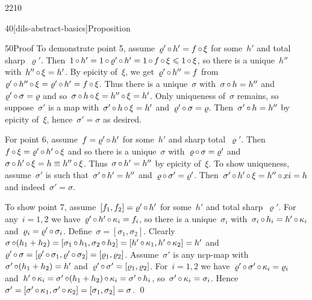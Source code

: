 \begin{parsec}{2210}
\begin{point}{40}[dils-abstract-basics]{Proposition}
\begin{point}{50}{Proof}
To demonstrate point 5, assume~$\varrho' \mathop{\circ} h' = f \mathop{\circ} \xi$
    for some~$h'$ and total sharp~$\varrho'$.
    Then~$1 \mathop{\circ} h' = 1 \mathop{\circ} \varrho' \mathop{\circ} h'
                    = 1 \mathop{\circ} f \mathop{\circ} \xi \leqslant 1 \mathop{\circ} \xi$,
                    so there is a unique~$h''$
                    with~$h'' \mathop{\circ} \xi = h'$.
By epicity of~$\xi$,
    we get~$\varrho'\mathop{\circ} h'' = f$
    from~$\varrho' \mathop{\circ} h'' \mathop{\circ} \xi = \varrho' \mathop{\circ} h' = f \mathop{\circ} \xi$.
Thus there is a unique~$\sigma$
    with~$\sigma \mathop{\circ} h = h''$ and~$\varrho' \mathop{\circ} \sigma = \varrho$
    and so~$\sigma \mathop{\circ} h \mathop{\circ} \xi = h'' \mathop{\circ} \xi = h'$.
Only uniqueness of~$\sigma$ remains,
    so suppose~$\sigma'$ is a map with~$\sigma'\mathop{\circ} h \mathop{\circ} \xi = h'$
            and~$\varrho' \mathop{\circ} \sigma = \varrho$.
    Then~$\sigma' \mathop{\circ} h = h''$ by epicity of~$\xi$,
    hence~$\sigma'=\sigma$ as desired.

For point 6, assume~$f  = \varrho' \mathop{\circ} h'$
    for some~$h'$ and sharp total~$\varrho'$.
    Then~$f \mathop{\circ} \xi = \varrho' \mathop{\circ} h' \mathop{\circ} \xi $
    and so there is a unique~$\sigma$
    with~$\varrho \mathop{\circ} \sigma = \varrho'$
    and~$\sigma \mathop{\circ} h' \mathop{\circ} \xi = h \equiv h'' \mathop{\circ} \xi$.
    Thus~$\sigma \mathop{\circ} h' = h''$ by epicity of~$\xi$.
To show uniqueness,
    assume~$\sigma'$ is such that~$\sigma' \mathop{\circ} h' = h''$
    and~$\varrho \mathop{\circ} \sigma' = \varrho'$.
    Then~$\sigma' \mathop{\circ} h' \mathop{\circ} \xi = h'' \mathop{\circ} xi = h$
    and indeed~$\sigma' = \sigma$.

To show point 7, assume~$[f_1,f_2] = \varrho'\mathop{\circ} h'$
    for some~$h'$ and total sharp~$\varrho'$.
For any~$i=1,2$
    we have~$\varrho' \mathop{\circ} h' \mathop{\circ} \kappa_i = f_i$,
    so there is a unique~$\sigma_i$
    with~$\sigma_i \mathop{\circ} h_i = h' \mathop{\circ} \kappa_i$
    and~$\varrho_i = \varrho' \mathop{\circ} \sigma_i$.
Define~$\sigma = [\sigma_1, \sigma_2]$.
Clearly~$\sigma \mathop{\circ} (h_1 + h_2)
    = [\sigma_1 \mathop{\circ} h_1,\sigma_2 \mathop{\circ} h_2]
    = [ h' \mathop{\circ} \kappa_1,  h'\mathop{\circ} \kappa_2] = h'$
    and~$\varrho' \mathop{\circ} \sigma
            = [\varrho' \mathop{\circ} \sigma_1, \varrho' \mathop{\circ} \sigma_2]
            = [\varrho_1, \varrho_2]$.
Assume~$\sigma'$ is any ncp-map with~$\sigma' \mathop{\circ} (h_1 + h_2) = h'$
    and~$\varrho' \mathop{\circ} \sigma' = [\varrho_1, \varrho_2]$.
For~$i=1,2$
    we have~$\varrho' \mathop{\circ} \sigma' \mathop{\circ} \kappa_i = \varrho_i$
    and~$h' \mathop{\circ} \kappa_i = \sigma' \mathop{\circ} (h_1 + h_2) \mathop{\circ} \kappa_i
                =  \sigma' \mathop{\circ} h_i$,
                so~$\sigma' \mathop{\circ} \kappa_i = \sigma_i$.
    Hence~$\sigma' = [\sigma' \mathop{\circ} \kappa_1, 
                \sigma' \mathop{\circ} \kappa_2] = [\sigma_1,\sigma_2] = \sigma$.
                \qed
\end{point}
\end{point}
\end{parsec}


